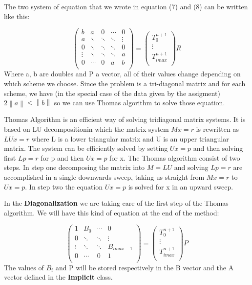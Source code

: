 \documentclass [10 pt, a4 paper]{article}
\begin{document}
The two system of equation that we wrote in equation (7) and (8) can be written like this:

\begin{equation}
\begin{pmatrix} b    &    a   &    0   & \cdots &   0    \\
a    & \ddots & \ddots & \ddots & \vdots \\
0    & \ddots & \ddots & \ddots &    0   \\
\vdots & \ddots & \ddots & \ddots &   a    \\ 
0    & \cdots &    0   &   a    &    b   \\
\end{pmatrix}
=
\begin{pmatrix} T_{0}^{n+1} \\ 
\vdots \\ 
T_{imax}^{n+1} \\
\end{pmatrix}
R
\end{equation}
Where a, b are doubles and P a vector, all of their values change depending on 
which scheme we choose. Since the problem is a tri-diagonal matrix and for each scheme,
we have (in the special case of the data given by the assigment) 
$ 2\left \| a \right \| \leq \left \| b \right \| $ so we can use Thomas algorithm to
solve those equation.

Thomas Algorithm is an efficient way of solving tridiagonal matrix systems. It is based
on LU decompositionin which the matrix system $Mx = r$ is rewritten as $LUx = r$ where L 
is a lower triangular matrix and U is an upper triangular matrix. The system can be 
efficiently solved by setting $Ux = p$ and then solving first $Lp = r$ for p and then 
$Ux=p$ for x. The Thomas algorithm consist of two steps. In step one decomposing the matrix
into $M=LU$ and solving $Lp=r$ are accomplished in a single downwards sweep, taking us
straight from $Mx=r$ to $Ux=p$. In step two the equation $Ux=p$ is solved for x in  an
upward sweep.

In the \textbf{Diagonalization} we are taking care of the first step of the Thomas algorithm.
We will have this kind of equation at the end of the method:

\begin{equation}
\begin{pmatrix} 1    &    B_{0}    & \cdots &   0    \\
                0    & \ddots     & \ddots  & \vdots \\
                \vdots & \ddots & \ddots & B_{imax - 1}  \\ 
                0    & \cdots   &   0    &    1   \\
\end{pmatrix}
=
\begin{pmatrix} T_{0}^{n+1} \\ 
\vdots \\ 
T_{imax}^{n+1} \\
\end{pmatrix}
P
\end{equation}
The values of $B_{i}$ and P will be stored respectively in the B vector and the A
vector defined in the \textbf{Implicit} class.
\end{document}
